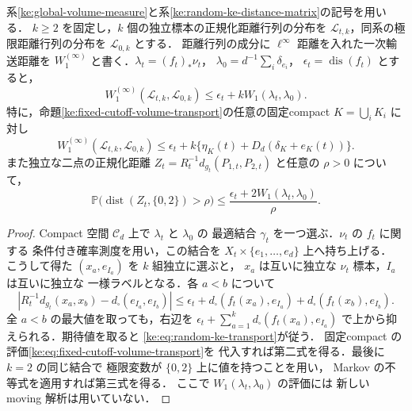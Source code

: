 \begin{proposition}[同じ射影による有限標本距離行列の輸送予算]
\label{ke:random-ke-distance-transport}
系\ref{ke:global-volume-measure}と系\ref{ke:random-ke-distance-matrix}の記号を用いる．
$k\ge2$ を固定し，$k$ 個の独立標本の正規化距離行列の分布を
$\mathcal L_{t,k}$，同系の極限距離行列の分布を $\mathcal L_{0,k}$ とする．
距離行列の成分に $\ell^\infty$ 距離を入れた一次輸送距離を
$W_1^{(\infty)}$ と書く．$\lambda_t=(f_t)_*\nu_t$，
$\lambda_0=d^{-1}\sum_i\delta_{e_i}$，
$\epsilon_t=\operatorname{dis}(f_t)$ とすると，
\begin{equation}\label{ke:eq:random-ke-transport}
 W_1^{(\infty)}(\mathcal L_{t,k},\mathcal L_{0,k})
 \le\epsilon_t+kW_1(\lambda_t,\lambda_0).
\end{equation}
特に，命題\ref{ke:fixed-cutoff-volume-transport}の任意の固定compact
$K=\bigcup_iK_i$ に対し
\begin{equation}\label{ke:eq:random-ke-fixed-cutoff-transport}
 W_1^{(\infty)}(\mathcal L_{t,k},\mathcal L_{0,k})
 \le\epsilon_t+k\{\eta_K(t)+D_d(\delta_K+e_K(t))\}.
\end{equation}
また独立な二点の正規化距離
$Z_t=R_t^{-1}d_{g_t}(P_{1,t},P_{2,t})$ と任意の $\rho>0$ について，
\begin{equation}\label{ke:eq:random-ke-concentration}
 \mathbb P\bigl(\operatorname{dist}(Z_t,\{0,2\})>\rho\bigr)
 \le\frac{\epsilon_t+2W_1(\lambda_t,\lambda_0)}{\rho}.
\end{equation}
\end{proposition}

\begin{proof}
Compact 空間 $\mathcal C_d$ 上で $\lambda_t$ と $\lambda_0$ の
最適結合 $\gamma_t$ を一つ選ぶ．$\nu_t$ の $f_t$ に関する
条件付き確率測度を用い，この結合を
$X_t\times\{e_1,\ldots,e_d\}$ 上へ持ち上げる．
こうして得た $(x_a,e_{I_a})$ を $k$ 組独立に選ぶと，
$x_a$ は互いに独立な $\nu_t$ 標本，$I_a$ は互いに独立な
一様ラベルとなる．各 $a<b$ について
\[
 \left|R_t^{-1}d_{g_t}(x_a,x_b)
       -d_\square(e_{I_a},e_{I_b})\right|
 \le\epsilon_t+
 d_\square(f_t(x_a),e_{I_a})+
 d_\square(f_t(x_b),e_{I_b}).
\]
全 $a<b$ の最大値を取っても，右辺を
$\epsilon_t+\sum_{a=1}^k d_\square(f_t(x_a),e_{I_a})$
で上から抑えられる．期待値を取ると
\eqref{ke:eq:random-ke-transport}が従う．
固定compact の評価\eqref{ke:eq:fixed-cutoff-volume-transport}を
代入すれば第二式を得る．最後に $k=2$ の同じ結合で
極限変数が $\{0,2\}$ 上に値を持つことを用い，
Markov の不等式を適用すれば第三式を得る．
ここで $W_1(\lambda_t,\lambda_0)$ の評価には
新しい moving 解析は用いていない．
\end{proof}

